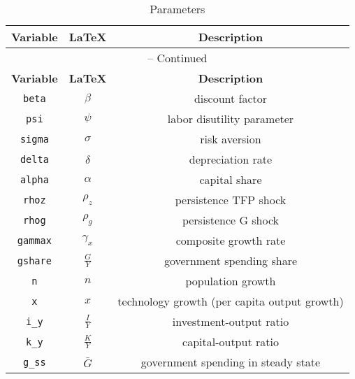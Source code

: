 \begin{center}
\begin{longtable}{ccc}
\caption{Parameters}\\%
\hline%
\multicolumn{1}{c}{\textbf{Variable}} &
\multicolumn{1}{c}{\textbf{\LaTeX}} &
\multicolumn{1}{c}{\textbf{Description}}\\%
\hline\hline%
\endfirsthead
\multicolumn{3}{c}{{\tablename} \thetable{} -- Continued}\\%
\hline%
\multicolumn{1}{c}{\textbf{Variable}} &
\multicolumn{1}{c}{\textbf{\LaTeX}} &
\multicolumn{1}{c}{\textbf{Description}}\\%
\hline\hline%
\endhead
\texttt{beta} & ${\beta}$ & discount factor\\
\texttt{psi} & ${\psi}$ & labor disutility parameter\\
\texttt{sigma} & ${\sigma}$ & risk aversion\\
\texttt{delta} & ${\delta}$ & depreciation rate\\
\texttt{alpha} & ${\alpha}$ & capital share\\
\texttt{rhoz} & ${\rho_z}$ & persistence TFP shock\\
\texttt{rhog} & ${\rho_g}$ & persistence G shock\\
\texttt{gammax} & ${\gamma_x}$ & composite growth rate\\
\texttt{gshare} & ${\frac{G}{Y}}$ & government spending share\\
\texttt{n} & ${n}$ & population growth\\
\texttt{x} & ${x}$ & technology growth (per capita output growth)\\
\texttt{i\_y} & ${\frac{I}{Y}}$ & investment-output ratio\\
\texttt{k\_y} & ${\frac{K}{Y}}$ & capital-output ratio\\
\texttt{g\_ss} & ${\bar G}$ & government spending in steady state\\
\hline%
\end{longtable}
\end{center}
